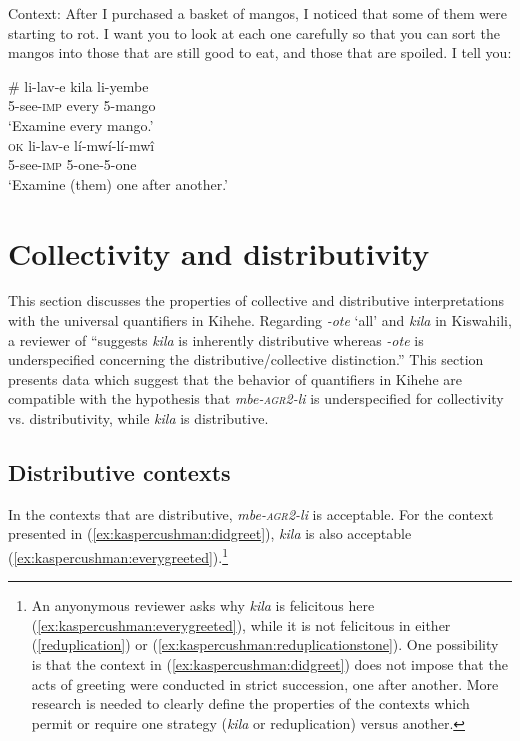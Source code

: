 \documentclass[output=paper,modfonts,nonflat]{langsci/langscibook}
\begin{document}
\begin{exe}

 \ex Context: After I purchased a basket of mangos, I noticed that some of them were starting to rot. I want you to look at each one carefully so that you can sort the mangos into those that are still good to eat, and those that are spoiled. I tell you: \label{ex:kaspercushman:onebyone} \\

\begin{xlist}

\ex 
\gll \# li-lav-e kila li-yembe \\
{} 5-see-\textsc{imp} every 5-mango \\
\glt `Examine every mango.' \\



\ex 
\gll \textsc{ok} li-lav-e lí-mwí-lí-mw\^i \\
{} 5-see-\textsc{imp} 5-one-5-one \\ \label{reduplication}
\glt `Examine (them) one after another.'

\end{xlist}
\end{exe}


\section{Collectivity and distributivity}

This section discusses the properties of collective and distributive interpretations with the universal quantifiers in Kihehe. 
Regarding \textit{-ote} `all' and \textit{kila} in Kiswahili, a reviewer of \citealt[396]{zerbian08} ``suggests \textit{kila} is inherently distributive whereas \textit{-ote} is underspecified concerning the distributive/collective distinction.''  This section presents data which suggest that the behavior of quantifiers in Kihehe are compatible with the hypothesis that \textit{mbe-\textsc{agr2}-li} is underspecified for collectivity vs. distributivity, while \textit{kila} is distributive.

\subsection{Distributive contexts}

In the contexts that are distributive, \textit{mbe-\textsc{agr2}-li} is acceptable. For the context presented in (\ref{ex:kaspercushman:didgreet}), \textit{kila} is also acceptable (\ref{ex:kaspercushman:everygreeted}).\footnote{An anyonymous reviewer asks why \textit{kila} is felicitous here (\ref{ex:kaspercushman:everygreeted}), while it is not felicitous in either (\ref{reduplication}) or (\ref{ex:kaspercushman:reduplicationstone}). One possibility is that the context in (\ref{ex:kaspercushman:didgreet}) does not impose that the acts of greeting were conducted in strict succession, one after another.  More research is needed to clearly define the properties of the contexts which permit or require one strategy (\textit{kila} or reduplication) versus another.} 
\end{document}
